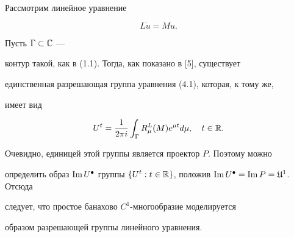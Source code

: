 \begin{notes}


Рассмотрим линейное уравнение


\begin{equation}


L \Dot u = Mu.


\end{equation}


Пусть $\Gamma \subset {\Bbb C}$ ---


контур такой, как в (1.1). Тогда, как показано в [5], существует


единственная разрешающая группа уравнения (4.1), которая, к тому же,


имеет вид


$$


U^{t} = \frac{1}{2\pi i}\int_{\Gamma }R_{\mu


}^L(M)e^{\mu t}d\mu, \quad t \in {\Bbb R}.


$$


Очевидно, единицей этой группы является проектор $P$. Поэтому можно


определить образ $\im U^{\bullet}$ группы $\{ U^{t}: t \in {\Bbb


R}\}$, положив $\im U^{\bullet} = \im P = {\frak U}^1$. Отсюда


следует, что простое банахово $C^1$-мно\-гообразие моделируется


образом разрешающей группы линейного уравнения.


\end{notes}





